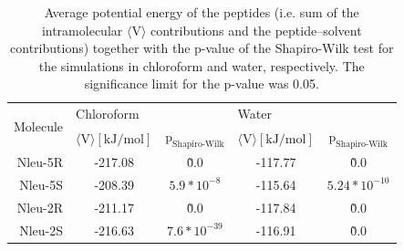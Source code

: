 \begin{table}[]
\centering
\caption{ Average potential energy of the peptides  (i.e. sum of the intramolecular $\langle \text{V} \rangle$ contributions  and  the  peptide–solvent  contributions)  together  with  the  p-value  of  the Shapiro-Wilk test for the simulations in chloroform and water, respectively. The significance limit for the p-value was 0.05.}
\label{tab: SIstatTestingNorm}
\begin{tabular}{r|cc|cc}
\multirow{2}{*}{Molecule} & \multicolumn{2}{l}{Chloroform} & \multicolumn{2}{l}{Water}        \\
    & $\langle \text{V} \rangle [\text{kJ}/\text{mol}]$ & $\text{p}_{\text{Shapiro-Wilk}}$ & $\langle \text{V} \rangle [\text{kJ}/\text{mol}]$ & $\text{p}_{\text{Shapiro-Wilk}}$  \\
    \hline
    Nleu-5R    & -217.08    & \~0.0          & -117.77  & \~0.0         \\
    Nleu-5S    & -208.39    &   $5.9*10^{-8}$  & -115.64  & $5.24*10^{-10}$ \\
    Nleu-2R    & -211.17    & \~0.0          & -117.84  & \~0.0         \\
    Nleu-2S    & -216.63    &   $7.6*10^{-39}$ & -116.91  & \~0.0                                        
\end{tabular}%
\end{table}


\begin{table}[]
\centering
\caption{Results of the Fisher t-test to validate the significance of the deviations in the 
average potential energy of the peptides. The significance limit for the p-value was 0.05}
\label{tab: SIstatTestingDiff}
\end{table}


\begin{table}[]
\centering
\caption{Percentage of sampled conformations with zero, one, or two hydrogen bonds 
for  Nleu-5R,  Nleu-5S,  Nleu-2R,  and  Nleu-2S  in  water.  Analysis  was  restricted  to  the 
clusters with the trans-peptoid bond.}
\label{tab: SIhydrogenBondsWater}
\end{table}



